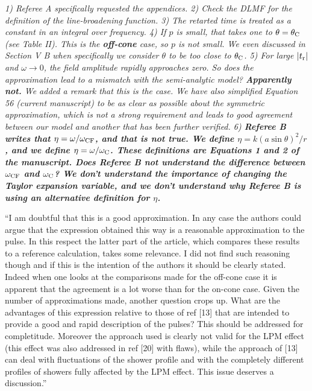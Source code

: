 \documentclass[12pt]{article}
\begin{document}
\textit{1) Referee A specifically requested the appendices.  2) Check the DLMF for the definition of the line-broadening function.  3) The retarted time is treated as a constant in an integral over frequency.  4) If $p$ is small, that takes one to $\theta = \theta_{\rm C}$ (see Table II).  This is the \textbf{off-cone} case, so $p$ is not small.  We even discussed in Section V B when specifically we consider $\theta$ to be too close to $\theta_{\rm C}$.  5) For large $|t_{\rm r}|$ and $\omega \to 0$, the field amplitude rapidly approaches zero.  So does the approximation lead to a mismatch with the semi-analytic model?  \textbf{Apparently not.}  We added a remark that this is the case. We have also simplified Equation 56 (current manuscript) to be as clear as possible about the symmetric approximation, which is not a strong requirement and leads to good agreement between our model and another that has been further verified.  6) \textbf{Referee B writes that $\eta = \omega/\omega_{\rm CF}$, and that is not true.  We define $\eta = k(a \sin\theta)^2/r$, and we define $\eta = \omega/\omega_{\rm C}$.  These definitions are Equations 1 and 2 of the manuscript.  Does Referee B not understand the difference between $\omega_{\rm CF}$ and $\omega_{\rm C}$?  We don't understand the importance of changing the Taylor expansion variable, and we don't understand why Referee B is using an alternative definition for $\eta$.}}

``I am doubtful that this is a good approximation. In any case the authors could argue that the expression obtained this way is a reasonable approximation to the pulse. In this respect the latter part of the article, which compares these results to a reference calculation, takes some relevance. I did not find such reasoning though and if this is the intention of the authors it should be clearly stated. Indeed when one looks at the comparisons made for the off-cone case it is apparent that the agreement is a lot worse than for the on-cone case. Given the number of approximations made, another question crops up. What are the advantages of this expression relative to those of ref [13] that are intended to provide a good and rapid description of the pulses? This should be addressed for completitude.  Moreover the approach used is clearly not valid for the LPM effect (this effect was also addressed in ref [20] with flaws), while the approach of [13] can deal with fluctuations of the shower profile and with the completely different profiles of showers fully affected by the LPM effect. This issue deserves a discussion.''
\end{document}
